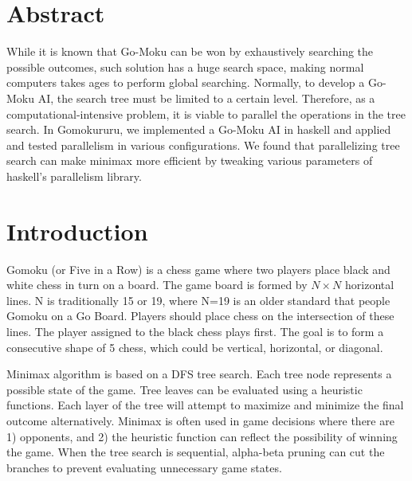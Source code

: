 \documentclass[twoside,11pt]{homework}
\date{\today}
\begin{document}
\maketitle

\section{Abstract}
While it is known that Go-Moku can be won by exhaustively searching the possible outcomes\cite{gomoku-solution}, such solution has a huge search space, making normal computers takes ages to perform global searching. Normally, to develop a Go-Moku AI, the search tree must be limited to a certain level. Therefore, as a computational-intensive problem, it is viable to parallel the operations in the tree search. In Gomokururu, we implemented a Go-Moku AI in haskell and applied and tested parallelism in various configurations. We found that parallelizing tree search can make minimax more efficient by tweaking various parameters of haskell's parallelism library.

\section{Introduction}
Gomoku (or Five in a Row) is a chess game where two players place black and white chess in turn on a board. The game board is formed by $N \times N$ horizontal lines. N is traditionally 15 or 19, where N=19 is an older standard that people Gomoku on a Go Board. Players should place chess on the intersection of these lines. The player assigned to the black chess plays first. The goal is to form a consecutive shape of 5 chess, which could be vertical, horizontal, or diagonal.

Minimax algorithm is based on a DFS tree search. Each tree node represents a possible state of the game. Tree leaves can be evaluated using a heuristic functions. Each layer of the tree will attempt to maximize and minimize the final outcome alternatively. Minimax is often used in game decisions where there are 1) opponents, and 2) the heuristic function can reflect the possibility of winning the game. When the tree search is sequential, alpha-beta pruning can cut the branches to prevent evaluating unnecessary game states.

\end{document}
